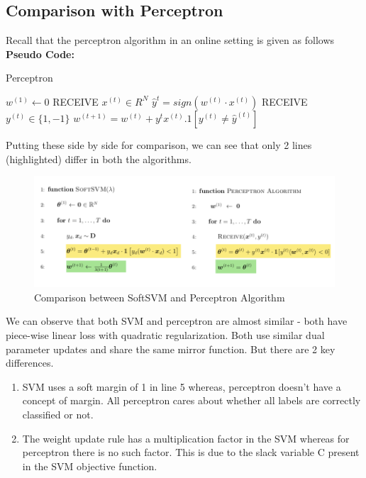 \documentclass[11pt]{article}
\begin{document}
\subsection{Comparison with Perceptron}
Recall that the perceptron algorithm in an online setting is given as follows
\newline\textbf{Pseudo Code:}
\begin{algorithm}[H]
\caption{Perceptron}
\begin{algorithmic}[1]
\STATE $w^{(1)} \leftarrow 0$ 
\STATE RECEIVE $x^{(t)} \in R^N$ 
\STATE $\hat{y}^{t} = sign(w^{(t)}\cdot x^{(t)})$
\STATE RECEIVE $y^{(t)} \in \{1,-1\}$ 
\STATE $w^{(t+1)} = w^{(t)} + y^tx^{(t)}.1[y^{(t)} \neq \hat{y}^{(t)}]$ 
\ENDFOR
\end{algorithmic}
\end{algorithm}
Putting these side by side for comparison, we can see that only 2 lines (highlighted) differ in both the algorithms.
\begin{figure}[H]
\centering
\includegraphics[scale=0.5]{images/comp_percep.png}
\caption{Comparison between SoftSVM and Perceptron Algorithm}
\end{figure}
We can observe that both SVM and perceptron are almost similar - both have piece-wise linear loss with quadratic regularization. Both use similar dual parameter updates and share the same mirror function. But there are 2 key differences.

\begin{enumerate}
    \item SVM uses a soft margin of 1 in line 5 whereas, perceptron doesn't have a concept of margin. All perceptron cares about whether all labels are correctly classified or not.
    \item The weight update rule has a multiplication factor in the SVM whereas for perceptron there is no such factor. This is due to the slack variable C present in the SVM objective function. 
\end{enumerate}
\end{document}
